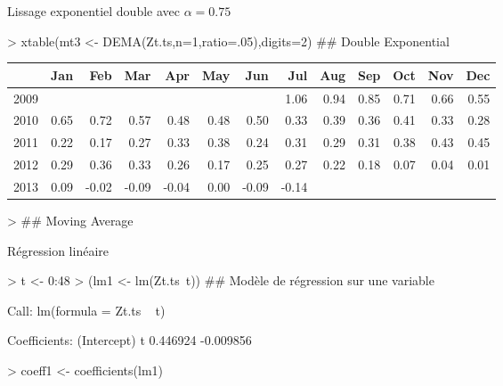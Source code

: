\documentclass{article}
\begin{document}
\clearpage 
Lissage exponentiel double avec $\alpha=0.75$
\begin{Schunk}
\begin{Sinput}
> xtable(mt3 <- DEMA(Zt.ts,n=1,ratio=.05),digits=2) ## Double Exponential 
\end{Sinput}
\begin{table}[ht]
\centering
\begin{tabular}{rrrrrrrrrrrrr}
  \hline
 & Jan & Feb & Mar & Apr & May & Jun & Jul & Aug & Sep & Oct & Nov & Dec \\ 
  \hline
2009 &  &  &  &  &  &  & 1.06 & 0.94 & 0.85 & 0.71 & 0.66 & 0.55 \\ 
  2010 & 0.65 & 0.72 & 0.57 & 0.48 & 0.48 & 0.50 & 0.33 & 0.39 & 0.36 & 0.41 & 0.33 & 0.28 \\ 
  2011 & 0.22 & 0.17 & 0.27 & 0.33 & 0.38 & 0.24 & 0.31 & 0.29 & 0.31 & 0.38 & 0.43 & 0.45 \\ 
  2012 & 0.29 & 0.36 & 0.33 & 0.26 & 0.17 & 0.25 & 0.27 & 0.22 & 0.18 & 0.07 & 0.04 & 0.01 \\ 
  2013 & 0.09 & -0.02 & -0.09 & -0.04 & 0.00 & -0.09 & -0.14 &  &  &  &  &  \\ 
   \hline
\end{tabular}
\end{table}\begin{Sinput}
>                                                   ## Moving Average
\end{Sinput}
\end{Schunk}
\clearpage 
Régression linéaire
\begin{Schunk}
\begin{Sinput}
> t <- 0:48
> (lm1 <- lm(Zt.ts~t)) ## Modèle de régression sur une variable
\end{Sinput}
\begin{Soutput}
Call:
lm(formula = Zt.ts ~ t)

Coefficients:
(Intercept)            t  
   0.446924    -0.009856  
\end{Soutput}
\begin{Sinput}
> coeff1 <- coefficients(lm1)
\end{Sinput}
\end{Schunk}
\end{document}
